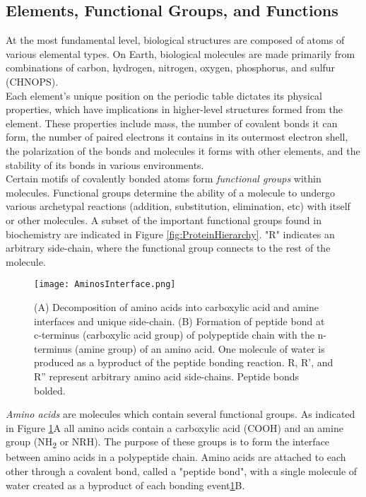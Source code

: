 {\subsection{Elements, Functional Groups, and Functions}

At the most fundamental level, biological structures are composed of atoms of various elemental types.  On Earth, biological molecules are made primarily from combinations of carbon, hydrogen, nitrogen, oxygen, phosphorus, and sulfur (CHNOPS).\\

Each element's unique position on the periodic table dictates its physical properties, which have implications in higher-level structures formed from the element.  These properties include mass, the number of covalent bonds it can form, the number of paired electrons it contains in its outermost electron shell, the polarization of the bonds and molecules it forms with other elements, and the stability of its bonds in various environments.\\

Certain motifs of covalently bonded atoms form \textit{functional groups} within molecules.  Functional groups determine the ability of a molecule to undergo various archetypal reactions (addition, substitution, elimination, etc) with itself or other molecules.  A subset of the important functional groups found in biochemistry are indicated in Figure \ref{fig:ProteinHierarchy}.  "R" indicates an arbitrary side-chain, where the functional group connects to the rest of the molecule.\\



\begin{figure}
  \texttt{[image: AminosInterface.png]}
  \caption{(A) Decomposition of amino acids into carboxylic acid and amine interfaces and unique side-chain. (B) Formation of peptide bond at c-terminus (carboxylic acid group) of polypeptide chain with the n-terminus (amine group) of an amino acid. One molecule of water is produced as a byproduct of the peptide bonding reaction.  R, R', and R'' represent arbitrary amino acid side-chains.  Peptide bonds bolded.}
  \label{fig:AminosInterface}
\end{figure}

\textit{Amino acids} are molecules which contain several functional groups.  As indicated in Figure \ref{fig:AminosInterface}A all amino acids contain a carboxylic acid (COOH) and an amine group (NH\textsubscript{2} or NRH).  The purpose of these groups is to form the interface between amino acids in a polypeptide chain.  Amino acids are attached to each other through a covalent bond, called a "peptide bond", with a single molecule of water created as a byproduct of each bonding event\ref{fig:AminosInterface}B.\\

}
